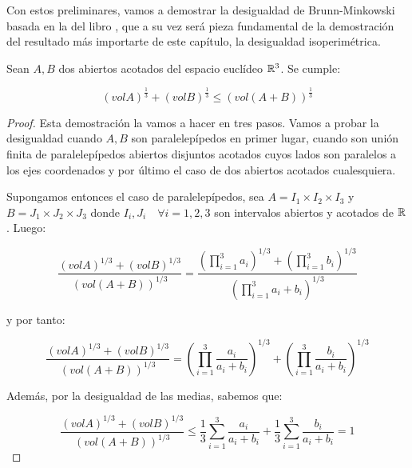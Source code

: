 Con estos preliminares, vamos a demostrar la desigualdad de Brunn-Minkowski basada en la del libro \cite{montielrosbook}, que a su vez será pieza fundamental de la demostración del resultado más importarte de este capítulo, la desigualdad isoperimétrica.
\begin{theorem}
Sean $A, B$ dos abiertos acotados del espacio euclídeo $\mathbb{R}^3$. Se cumple:

\begin{equation*}
    (vol A)^{\frac{1}{3}} + (vol B)^{\frac{1}{3}} \leq (vol (A+B))^{\frac{1}{3}}
\end{equation*}
\end{theorem}
\begin{proof}
Esta demostración la vamos a hacer en tres pasos. Vamos a probar la desigualdad cuando $A,B$ son paralelepípedos en primer lugar, cuando son unión finita de paralelepípedos abiertos disjuntos acotados cuyos lados son paralelos a los ejes coordenados y por último el caso de dos abiertos acotados cualesquiera.

Supongamos entonces el caso de paralelepípedos, sea $A = I_1 \times I_2 \times I_3$ y $B = J_1 \times J_2 \times J_3$ donde $I_i,J_i \quad \forall i=1,2,3$ son intervalos abiertos y acotados de $\mathbb{R}$. Luego:

\begin{equation*}
    \frac{ \left(vol A \right)^{1/3} + \left(vol B \right)^{1/3}}{\left(vol (A+B) \right)^{1/3}} = \frac{\left(\displaystyle\prod_{i=1}^3 a_i \right)^{1/3} + \left(\displaystyle\prod_{i=1}^3 b_i \right)^{1/3}}{\left(\displaystyle\prod_{i=1}^3 a_i+b_i \right)^{1/3}}
\end{equation*}

y por tanto:

\begin{equation*}
    \frac{ \left(vol A \right)^{1/3} + \left(vol B \right)^{1/3}}{\left(vol (A+B) \right)^{1/3}} = \left(\displaystyle\prod_{i=1}^3 \frac{a_i}{a_i+b_i} \right)^{1/3} + \left(\displaystyle\prod_{i=1}^3 \frac{b_i}{a_i+b_i} \right)^{1/3}
\end{equation*}

Además, por la desigualdad de las medias, sabemos que:

\begin{equation*}
    \frac{ \left(vol A \right)^{1/3} + \left(vol B \right)^{1/3}}{\left(vol (A+B) \right)^{1/3}} \leq
    \frac{1}{3} \displaystyle\sum_{i=1}^3 \frac{a_i}{a_i+b_i} + \frac{1}{3} \displaystyle\sum_{i=1}^3 \frac{b_i}{a_i+b_i} = 1
\end{equation*}


\end{proof}
